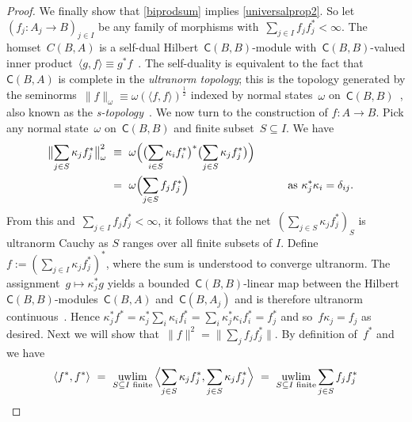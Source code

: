 \documentclass[reqno,T1,11pt]{amsproc}
\newcommand{\uwlim}{\qopname\relax m{uwlim}}
\newcommand{\cat}[1]{\mathsf{#1}}		%
\theoremstyle{plain}
\theoremstyle{remark}
\numberwithin{equation}{section}
\begin{document}
\begin{proof}
We finally show that \ref{biprodsum} implies \ref{universalprop2}. So let~$\left(f_j: A_j \to B\right)_{j\in I}$ be any family of morphisms
        with~$\sum_{j \in I}f_jf_j^* < \infty$.
The homset~$C(B,A)$
    is a self-dual Hilbert~$\cat{C}(B,B)$-module
    with~$\cat{C}(B,B)$-valued inner
    product~$\langle g, f\rangle \equiv g^*f$~\cite[Proposition~2.15]{wstarcat}.
The self-duality is equivalent to the fact
    that~$\cat{C}(B,A)$ is complete in the \emph{ultranorm topology};
    this is the topology
    generated by the seminorms~$\| f \|_\omega \equiv \omega(\langle f,f\rangle)^\frac{1}{2}$
    indexed by normal states~$\omega$ on~$\cat{C}(B,B)$~\cite[\S149\textsubscript{V}]{bas}, also known as the \emph{s-topology}~\cite[p.~88]{wstarcat}. We now turn to the construction of $f : A \to B$.
    Pick any normal state~$\omega$ on~$\cat{C}(B,B)$
        and finite subset~$S \subseteq I$.  We have
\begin{alignat*}{2}
    \bigl\| \sum_{j \in S} \kappa_j f_j^* \bigr\|^2_\omega
    &\ \equiv \ 
    \omega\Bigl(\bigl(\sum_{i \in S} \kappa_i f_i^*\bigr)^*
            \bigl(\sum_{j \in S} \kappa_j f_j^*\bigr)\Bigr) \\
    &\ =\ 
    \omega\Bigl( \sum_{j \in S} f_j f_j^*
    \Bigr) &\qquad&\text{as~$\kappa_j^*\kappa_i = \delta_{ij}$}.
\end{alignat*}
From this and~$\sum_{j \in I} f_jf_j^* < \infty$,
    it follows that the net~$\left(\sum_{j \in S} \kappa_j f_j^*\right)_S$
    is ultranorm Cauchy as $S$ ranges over all finite subsets of $I$.
    Define~$f := \left( \sum_{j \in I} \kappa_jf_j^* \right)^*$,
        where the sum is understood to converge ultranorm.
The assignment~$g \mapsto \kappa_j^*g$
    yields a bounded~$\cat{C}(B,B)$-linear map between
    the Hilbert~$\cat{C}(B,B)$-modules~$\cat{C}(B,A)$ and~$\cat{C}(B,A_j)$
    and is therefore ultranorm continuous~\cite[\S148]{bas}.
    Hence
        $\kappa_j^* f^*
             =  \kappa_j^* \sum_{i} \kappa_i f_i^*
             =  \sum_i \kappa_{j }^*\kappa_i f_i^*
            =  f_j^*$
            and so~$f \kappa_j = f_j$ as desired.
Next we will show that~$\|f \|^2 = \|\sum_j f_j f_j^*\|$.
    By definition of~$f^*$ and \cite[\S148\textsubscript{V}]{bas}
         we have~
 \begin{equation*}
         \langle f^*, f^*\rangle
         \ =\  \uwlim_{S\subseteq I\text{ finite}} \, \Bigl\langle \sum_{j \in S} \kappa_j f^*_j,
                        \sum_{j \in S}\kappa_j f^*_j \Bigr\rangle
         \ =\  \uwlim_{S\subseteq I\text{ finite}} \sum_{j \in S} f_j f_j^*

\end{equation*}
\end{proof}
\end{document}
